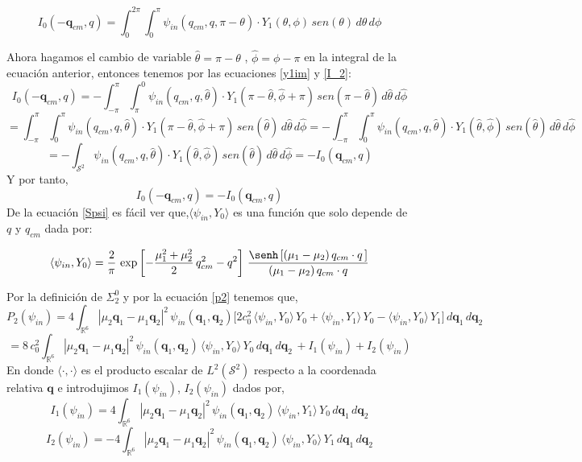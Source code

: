 \documentclass[12pt]{book}
\numberwithin{equation}{chapter}
\def\q{\mathbf{q}}
\def\n{\noindent}
\def\R{\mathbb{R}}
\def\S{\mathcal{S}}
\def\la{\langle}
\def\ra{\rangle}
\def\t{\theta}
\begin{document}
$$ I_{0}(-\q_{cm},q)= \int_{0}^{2\pi} \int_{0}^{\pi} \psi_{in}(q_{cm},q,\pi-\t)\cdot Y_{1}(\t,\phi) \, sen(\t) \, d\t \, d\phi $$

\n Ahora hagamos el cambio de variable $ \hat{\t}= \pi - \t $ , $ \hat{\phi}= \phi - \pi $ en la integral de la ecuaci\'on anterior, entonces tenemos por las ecuaciones \eqref{y1im} y \eqref{I_2}:
$$ I_{0}(-\q_{cm},q)= - \int_{-\pi}^{\pi} \int_{\pi}^{0} \psi_{in}(q_{cm},q,\hat{\t})\cdot Y_{1}(\pi-\hat{\t},\hat{\phi}+\pi) \, sen(\pi-\hat{\t}) \, d\hat{\t} \, d\hat{\phi}$$
$$ = \int_{-\pi}^{\pi} \int_{0}^{\pi} \psi_{in}(q_{cm},q,\hat{\t})\cdot Y_{1}(\pi-\hat{\t},\hat{\phi}+\pi) \, sen(\hat{\t}) \, d\hat{\t} \, d\hat{\phi}
=- \int_{-\pi}^{\pi} \int_{0}^{\pi} \psi_{in}(q_{cm},q,\hat{\t})\cdot Y_{1}(\hat{\t},\hat{\phi}) \, sen(\hat{\t}) \, d\hat{\t} \, d\hat{\phi}$$
$$=- \int_{\S^{2}} \psi_{in}(q_{cm},q,\hat{\t})\cdot Y_{1}(\hat{\t},\hat{\phi}) \, sen(\hat{\t}) \, d\hat{\t} \, d\hat{\phi} = - I_{0}(\q_{cm},q) $$
Y por tanto,
\begin{equation}\label{I-imp}
I_{0}(-\q_{cm},q)=- I_{0}(\q_{cm},q)
\end{equation}
De la ecuaci\'on \eqref{Spsi} es f\'acil ver que,$\la \psi_{in},Y_{0} \ra$ es una funci\'on que solo depende de $q$ y $q_{cm}$ dada por:

\begin{equation}\label{psi-y0}
\la \psi_{in},Y_{0} \ra =
\frac{2}{\pi}\, \exp \left[ -\frac{\mu_{1}^{2}+\mu_{2}^{2}}{2}\, q_{cm}^{2} -q^{2} \right]\, \frac{ \senh \left[ (\mu_{1}-\mu_{2})\, q_{cm} \cdot q \, \right]}{ (\mu_{1}-\mu_{2})\, q_{cm} \cdot q }
\end{equation}

\n Por la definici\'on de $\Sigma_{2}^{0}$ y por la ecuaci\'on \eqref{p2} tenemos que,
$$ P_{2}(\psi_{in})= 4 \int_{\R^{6}} |\mu_{2}\q_{1} -\mu_{1}\q_{2}|^{2}\, \psi_{in}(\q_{1},\q_{2}) \Big[ 2c_{0}^{2}\, \la \psi_{in},Y_{0} \ra \, Y_{0} + \la \psi_{in},Y_{1} \ra \, Y_{0} - \la \psi_{in},Y_{0} \ra \, Y_{1} \Big] \, d\q_{1}\, d\q_{2} $$
\begin{equation}\label{p2_2}
= 8\,c_{0}^{2} \int_{\R^{6}} |\mu_{2}\q_{1} -\mu_{1}\q_{2}|^{2}\, \psi_{in}(\q_{1},\q_{2})\, \la \psi_{in},Y_{0} \ra \, Y_{0} \, d\q_{1}\, d\q_{2}\, + I_{1}(\psi_{in}) + I_{2}(\psi_{in})
\end{equation}
En donde $ \la \cdot , \cdot \ra $ es el producto escalar de $L^{2}(\S^{2})$ respecto a la coordenada relativa $\q$ e introdujimos $I_{1}(\psi_{in})$, $I_{2}(\psi_{in})$ dados por,
$$ I_{1}(\psi_{in})= 4 \int_{\R^{6}} |\mu_{2}\q_{1} -\mu_{1}\q_{2}|^{2}\, \psi_{in}(\q_{1},\q_{2})\, \la \psi_{in},Y_{1} \ra \, Y_{0} \, d\q_{1}\, d\q_{2} $$
$$ I_{2}(\psi_{in})= -4 \int_{\R^{6}} |\mu_{2}\q_{1} -\mu_{1}\q_{2}|^{2}\, \psi_{in}(\q_{1},\q_{2})\, \la \psi_{in},Y_{0} \ra \, Y_{1} \, d\q_{1}\, d\q_{2} $$
\end{document}
